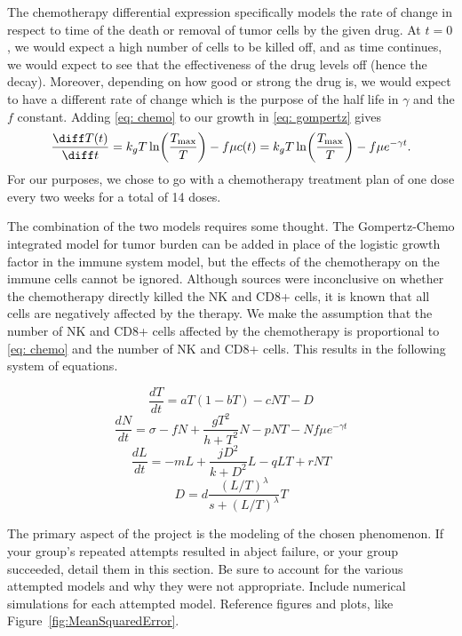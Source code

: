 \documentclass[11pt]{amsart}
\begin{document}
The chemotherapy differential expression specifically models the rate of change in respect to time of the death or removal of tumor cells by the given drug.
At $t=0$, we would expect a high number of cells to be killed off, and as time continues, we would expect to see that the effectiveness of the drug levels off (hence the decay).
Moreover, depending on how good or strong the drug is, we would expect to have a different rate of change which is the purpose of the half life in $\gamma$ and the $f$ constant.
Adding \eqref{eq: chemo} to our growth in \eqref{eq: gompertz} gives 
\begin{equation}
	\frac{\diff T(t)}{\diff t} = k_g T \ln \biggl(\frac{T_{\max}}{T} \biggr) - f \mu c(t) =k_g T \ln \biggl(\frac{T_{\max}}{T} \biggr) - f \mu e^{-\gamma t} \label{eq: gompertz-chemo}.
\end{equation}
For our purposes, we chose to go with a chemotherapy treatment plan of one dose every two weeks for a total of 14 doses. 



The combination of the two models requires some thought. The Gompertz-Chemo integrated model for tumor burden can be added in place of the logistic growth factor in the immune system model, but the effects of the chemotherapy on the immune cells cannot be ignored. Although sources were inconclusive on whether the chemotherapy directly killed the NK and CD8+ cells, it is known that all cells are negatively affected by the therapy. We make the assumption that the number of NK and CD8+ cells affected by the chemotherapy is proportional to \eqref{eq: chemo} and the number of NK and CD8+ cells. This results in the following system of equations.

\begin{equation} \label{eq1}
\frac{dT}{dt} = aT(1-bT) - cNT - D 
\end{equation}
\begin{equation} \label{eq2}
\frac{dN}{dt} = \sigma - fN +\frac{gT^2}{h + T^2}N - pNT - Nf \mu e^{-\gamma t}
\end{equation}
\begin{equation} \label{eq3}
\frac{dL}{dt} = - mL +\frac{jD^2}{k + D^2}L - qLT + rNT
\end{equation}
\begin{equation} \label{eq4}
D = d\frac{(L/T)^\lambda}{s + (L/T)^\lambda}T
\end{equation}



 The primary aspect of the project is the modeling of the chosen phenomenon. If your group's repeated attempts resulted in abject failure, or your group succeeded, detail them in this section. Be sure to account for the various attempted models and why they were not appropriate. Include numerical simulations for each attempted model.  Reference figures and plots, like Figure~\ref{fig:MeanSquaredError}.
\end{document}
